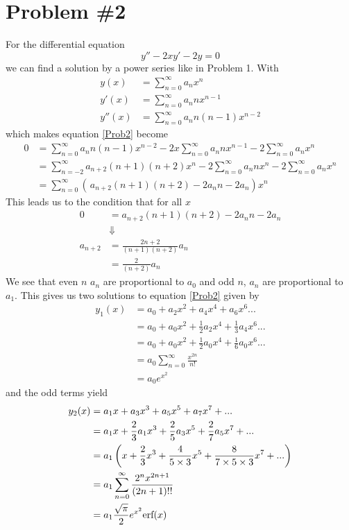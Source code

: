 \documentclass[11pt]{article}
\numberwithin{equation}{section}
\begin{document}
\section{Problem \#2}
For the differential equation 
\begin{equation}
y'' - 2xy' - 2y =0
\label{Prob2}
\end{equation}
we can find a solution by a power series like in Problem 1. With
\begin{align*}
y(x) &= \sum_{n=0}^{\infty}a_nx^{n}\\
y'(x) &= \sum_{n=0}^{\infty}a_nnx^{n-1}\\
y''(x) &= \sum_{n=0}^{\infty}a_nn(n-1)x^{n-2}
\end{align*}
which makes equation \ref{Prob2} become
\begin{align*}
0 &= \sum_{n=0}^{\infty}a_nn(n-1)x^{n-2} - 2x\sum_{n=0}^{\infty}a_nnx^{n-1} - 2\sum_{n=0}^{\infty}a_nx^{n}\\
&= \sum_{n=-2}^{\infty}a_{n+2}(n+1)(n+2)x^{n} - 2\sum_{n=0}^{\infty}a_nnx^{n} - 2\sum_{n=0}^{\infty}a_nx^{n}\\
&= \sum_{n=0}^{\infty}\left(\frac{}{}a_{n+2}(n+1)(n+2)- 2a_nn- 2a_n\right)x^{n}
\end{align*}
This leads us to the condition that for all $x$
\begin{align*}
0 &= a_{n+2}(n+1)(n+2)- 2a_nn- 2a_n\\
&\Downarrow\\
a_{n+2} &= \frac{2n+2}{(n+1)(n+2)}a_n\\
&= \frac{2}{(n+2)}a_n
\end{align*}
We see that even $n$ $a_n$ are proportional to $a_0$ and odd $n$, $a_n$ are proportional to 
$a_1$. This gives us two solutions to equation \ref{Prob2} given by
\begin{align*}
y_1(x) &= a_0 + a_2x^2 + a_4x^4 + a_6x^6...\\
&= a_0 + a_0x^2 + \frac{1}{2}a_2x^4 + \frac{1}{3}a_4x^6...\\
&= a_0 + a_0x^2 + \frac{1}{2}a_0x^4 + \frac{1}{6}a_0x^6...\\
&= a_0\sum_{n=0}^{\infty}\frac{x^{2n}}{n!}\\
&= a_0e^{x^2}
\end{align*}
and the odd terms yield
\begin{align*}
y_2(x) &= a_1x + a_3x^3 + a_5x^5 + a_7x^7 + ...\\
&= a_1x + \frac{2}{3}a_1x^3 + \frac{2}{5}a_3x^5 + \frac{2}{7}a_5x^7 + ...\\
&= a_1\left(x + \frac{2}{3}x^3 + \frac{4}{5\times3}x^5 + \frac{8}{7\times5\times3}x^7 + ...\right)\\
&= a_1\sum_{n=0}^{\infty}\frac{2^nx^{2n+1}}{(2n+1)!!} \\
&= a_1\frac{\sqrt{\pi}}{2}e^{x^2}\textnormal{erf}(x)
\end{align*}
\end{document}
